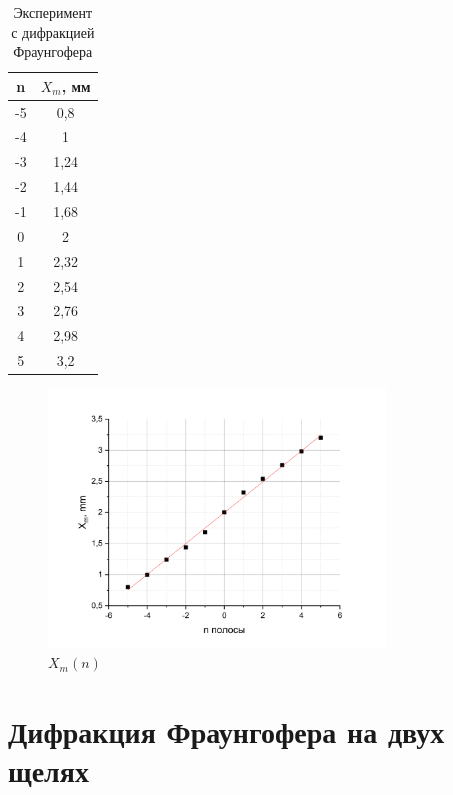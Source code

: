 \documentclass[a4paper, 12pt]{article}
\begin{document}
\begin{table}[h!]
\begin{center}
\caption{Эксперимент с дифракцией Фраунгофера}
\begin{tabular}{|c|c|}
\hline
n  & $X_m$, мм \\ \hline
-5 & 0,8       \\ \hline
-4 & 1         \\ \hline
-3 & 1,24      \\ \hline
-2 & 1,44      \\ \hline
-1 & 1,68      \\ \hline
0  & 2         \\ \hline
1  & 2,32      \\ \hline
2  & 2,54      \\ \hline
3  & 2,76      \\ \hline
4  & 2,98      \\ \hline
5  & 3,2       \\ \hline
\end{tabular}
\end{center}
\end{table}

\begin{figure}[h!]
    \begin{center}
    \includegraphics[width=0.8\textwidth]{graph2.png}
    \end{center}
    \caption{$X_m (n)$}
\end{figure}

\newpage

\section{Дифракция Фраунгофера на двух щелях}
	
\end{document}

